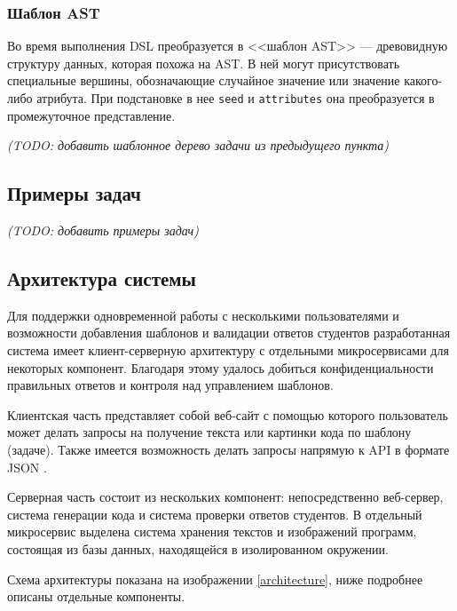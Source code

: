 \subsubsection{Шаблон AST}
Во время выполнения DSL преобразуется в <<шаблон AST>> --- древовидную структуру данных, которая похожа
на AST. В ней могут присутствовать специальные вершины, обозначающие случайное значение или значение
какого-либо атрибута.
При подстановке в нее \texttt{seed} и \texttt{attributes} она преобразуется в промежуточное представление.

\textit{(TODO: добавить шаблонное дерево задачи из предыдущего пункта)}
\subsection{Примеры задач}
\textit{(TODO: добавить примеры задач)}
\subsection{Архитектура системы}
Для поддержки одновременной работы с несколькими пользователями и возможности
добавления шаблонов и валидации ответов студентов разработанная система имеет
клиент-серверную архитектуру с отдельными микросервисами для
некоторых компонент. Благодаря этому удалось добиться конфиденциальности правильных
ответов и контроля над управлением шаблонов.

Клиентская часть представляет собой веб-сайт с помощью которого пользователь может делать
запросы на получение текста или картинки кода по шаблону (задаче). Также имеется возможность
делать запросы напрямую к API в формате JSON \cite{json}.

Серверная часть состоит из нескольких компонент: непосредственно веб-сервер, система генерации
кода и система проверки ответов студентов. В отдельный микросервис выделена система хранения
текстов и изображений программ, состоящая из базы данных, находящейся в изолированном окружении.

Схема архитектуры показана на изображении \ref{architecture}, ниже подробнее описаны отдельные
компоненты.

